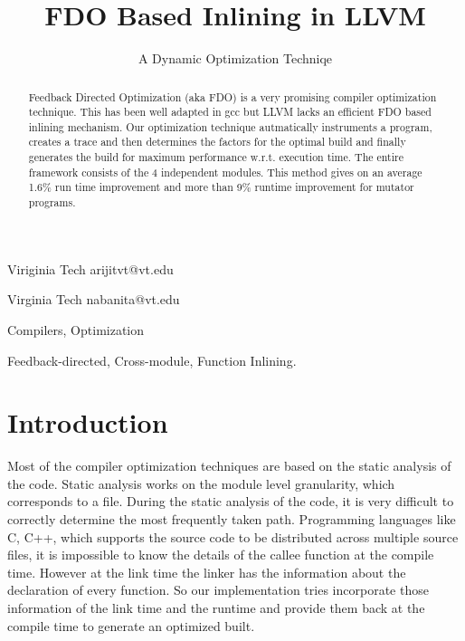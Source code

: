 \documentclass{sigplanconf}
\begin{document}
\setlength{\pdfpageheight}{\paperheight}
\setlength{\pdfpagewidth}{\paperwidth}




\title{FDO Based Inlining in LLVM}
\subtitle{A Dynamic Optimization Techniqe}

           {Viriginia Tech}
           {arijitvt@vt.edu}
           
           {Virginia Tech}
           {nabanita@vt.edu}

\maketitle

\begin{abstract}
Feedback Directed Optimization (aka FDO) is a very promising compiler optimization technique. This has been well adapted in gcc but LLVM lacks an efficient FDO based inlining mechanism. Our optimization technique autmatically instruments a program, creates a trace and then determines the factors for the optimal build and finally generates the build for maximum performance w.r.t. execution time. The entire framework consists of the 4 independent modules. This method gives on an average 1.6\% run time improvement and more than 9\% runtime improvement for mutator programs.
\end{abstract}

\terms
Compilers, Optimization

\keywords
Feedback-directed, Cross-module, Function Inlining.

\section{Introduction}
Most of the compiler optimization techniques are based on the static analysis of the code. Static analysis works on the module level granularity, which corresponds to a file. During the static analysis of the code, it is very difficult to correctly determine the most frequently taken path. Programming languages like C, C++, which supports the source code to be distributed across multiple source files, it is impossible to know the details of the callee function at the compile time. However at the link time the linker has the information about the declaration of every function. So our implementation tries incorporate those information of the link time and the runtime and provide them back at the compile time to generate an optimized built.
\end{document}

